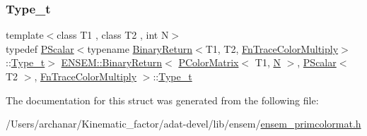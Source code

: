 \subsubsection{\texorpdfstring{Type\_t}{Type\_t}\hspace{0.1cm}{\footnotesize\ttfamily [3/3]}}
{\footnotesize\ttfamily template$<$class T1 , class T2 , int N$>$ \\
typedef \mbox{\hyperlink{classENSEM_1_1PScalar}{P\+Scalar}}$<$typename \mbox{\hyperlink{structENSEM_1_1BinaryReturn}{Binary\+Return}}$<$T1, T2, \mbox{\hyperlink{structENSEM_1_1FnTraceColorMultiply}{Fn\+Trace\+Color\+Multiply}}$>$\+::\mbox{\hyperlink{structENSEM_1_1BinaryReturn_3_01PColorMatrix_3_01T1_00_01N_01_4_00_01PScalar_3_01T2_01_4_00_01FnTraceColorMultiply_01_4_a1bb599bba25314482b08c26d201a0672}{Type\+\_\+t}}$>$ \mbox{\hyperlink{structENSEM_1_1BinaryReturn}{E\+N\+S\+E\+M\+::\+Binary\+Return}}$<$ \mbox{\hyperlink{classENSEM_1_1PColorMatrix}{P\+Color\+Matrix}}$<$ T1, \mbox{\hyperlink{adat__devel_2lib_2hadron_2operator__name__util_8cc_a7722c8ecbb62d99aee7ce68b1752f337}{N}} $>$, \mbox{\hyperlink{classENSEM_1_1PScalar}{P\+Scalar}}$<$ T2 $>$, \mbox{\hyperlink{structENSEM_1_1FnTraceColorMultiply}{Fn\+Trace\+Color\+Multiply}} $>$\+::\mbox{\hyperlink{structENSEM_1_1BinaryReturn_3_01PColorMatrix_3_01T1_00_01N_01_4_00_01PScalar_3_01T2_01_4_00_01FnTraceColorMultiply_01_4_a1bb599bba25314482b08c26d201a0672}{Type\+\_\+t}}}



The documentation for this struct was generated from the following file\+:\begin{DoxyCompactItemize}
\item 
/\+Users/archanar/\+Kinematic\+\_\+factor/adat-\/devel/lib/ensem/\mbox{\hyperlink{adat-devel_2lib_2ensem_2ensem__primcolormat_8h}{ensem\+\_\+primcolormat.\+h}}\end{DoxyCompactItemize}
